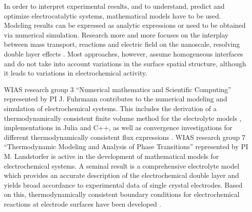 \documentclass[a4paper,10pt]{article}
\begin{document}
In order to interpret experimental results, and to understand, predict and optimize electrocatalytic systems, mathematical models have to be used.
Modeling results can be expressed as analytic expressions or need to be obtained via numerical simulation.
Research more and more focuses on the interplay between mass transport, reactions and  electric field on the nanoscale, resolving double layer effects \cite{lin2019understanding,tan2018double,eden2019modeling,bohra2019modeling}. Most approaches, however, assume homogeneous interfaces  and do not take into account variations in the surface spatial structure, although it  
leads to variations in electrochemical activity.


WIAS research group 3 ``Numerical mathematics and Scientific Computing'' represented by PI J. Fuhrmann contributes to the numerical modeling and simulation of electrochemical systems. This includes  the derivation of a thermodynamically consistent finite volume method \cite{JF2016} for the electrolyte models \cite{DGL2014,VagnerEtAl2019}, implementations in Julia and C++, as well as convergence investigations for  different thermodynamically consistent flux expressions \cite{CCFG2020}.   %
WIAS research group 7 ``Thermodynamic Modeling and Analysis of Phase Transitions'' represented by PI M. Landstorfer is active in the development of mathematical models for electrochemical systems.  A seminal result is a comprehensive electrolyte model which provides an accurate description of the electrochemical double layer and yields broad accordance to experimental data of single crystal electrodes. Based on this, thermodynamically consistent boundary conditions for electrochemical reactions at electrode surfaces have been developed \cite{DGM2013,DGL2014,Landstorfer2016187,landstorfer2017boundary}.
\end{document}
